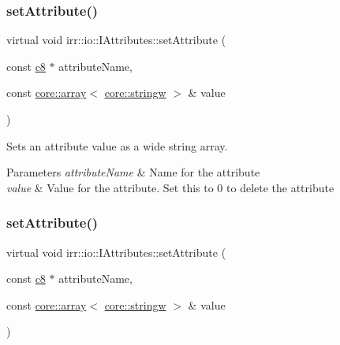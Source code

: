 \subsubsection{\texorpdfstring{set\+Attribute()}{setAttribute()}\hspace{0.1cm}{\footnotesize\ttfamily [9/10]}}
{\footnotesize\ttfamily virtual void irr\+::io\+::\+I\+Attributes\+::set\+Attribute (\begin{DoxyParamCaption}\item[{const \hyperlink{namespaceirr_a9395eaea339bcb546b319e9c96bf7410}{c8} $\ast$}]{attribute\+Name,  }\item[{const \hyperlink{classirr_1_1core_1_1array}{core\+::array}$<$ \hyperlink{namespaceirr_1_1core_a5aedb62cb47cf01d1c548ab5e6344d2d}{core\+::stringw} $>$ \&}]{value }\end{DoxyParamCaption})\hspace{0.3cm}{\ttfamily [pure virtual]}}



Sets an attribute value as a wide string array. 


\begin{DoxyParams}{Parameters}
{\em attribute\+Name} & Name for the attribute \\
\hline
{\em value} & Value for the attribute. Set this to 0 to delete the attribute \\
\hline
\end{DoxyParams}
\mbox{\label{classirr_1_1io_1_1IAttributes_a95abee2c34c3a438ba0df22d339b806e}} 
\subsubsection{\texorpdfstring{set\+Attribute()}{setAttribute()}\hspace{0.1cm}{\footnotesize\ttfamily [10/10]}}
{\footnotesize\ttfamily virtual void irr\+::io\+::\+I\+Attributes\+::set\+Attribute (\begin{DoxyParamCaption}\item[{const \hyperlink{namespaceirr_a9395eaea339bcb546b319e9c96bf7410}{c8} $\ast$}]{attribute\+Name,  }\item[{const \hyperlink{classirr_1_1core_1_1array}{core\+::array}$<$ \hyperlink{namespaceirr_1_1core_a5aedb62cb47cf01d1c548ab5e6344d2d}{core\+::stringw} $>$ \&}]{value }\end{DoxyParamCaption})\hspace{0.3cm}{\ttfamily [pure virtual]}}



